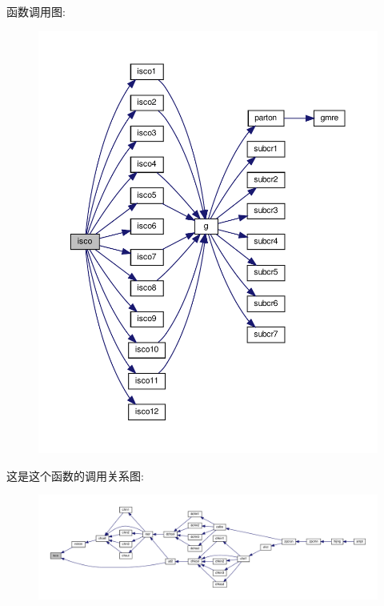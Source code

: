 函数调用图\+:
\nopagebreak
\begin{figure}[H]
\begin{center}
\leavevmode
\includegraphics[width=350pt]{isco_8f90_a3b77823a20219107cd4dbe957d70fd6c_cgraph}
\end{center}
\end{figure}
这是这个函数的调用关系图\+:
\nopagebreak
\begin{figure}[H]
\begin{center}
\leavevmode
\includegraphics[width=350pt]{isco_8f90_a3b77823a20219107cd4dbe957d70fd6c_icgraph}
\end{center}
\end{figure}
